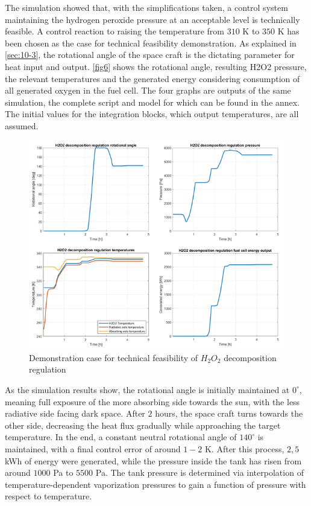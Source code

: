 The simulation showed that, with the simplifications taken, a control system maintaining the hydrogen peroxide pressure at an acceptable level is technically feasible. A control reaction to raising the temperature from $310$ K to $350$ K has been chosen as the case for technical feasibility demonstration. As explained in \autoref{sec:10-3}, the rotational angle of the space craft is the dictating parameter for heat input and output. \autoref{fig6} shows the rotational angle, resulting H2O2 pressure, the relevant temperatures and the generated energy considering consumption of all generated oxygen in the fuel cell. The four graphs are outputs of the same simulation, the complete script and model for which can be found in the annex. The initial values for the integration blocks, which output temperatures, are all assumed.

\begin{figure}[H]
	\centering\includegraphics[width=\linewidth]{feasibility}
	\caption{Demonstration case for technical feasibility of $H_2O_2$ decomposition regulation}\label{fig6}
\end{figure}
As the simulation results show, the rotational angle is initially maintained at $0^\circ$, meaning full exposure of the more absorbing side towards the sun, with the less radiative side facing dark space. After $2$ hours, the space craft turns towards the other side, decreasing the heat flux gradually while approaching the target temperature. In the end, a constant neutral rotational angle of $140^\circ$ is maintained, with a final control error of around $1-2$ K. After this process, $2,5$ kWh of energy were generated, while the pressure inside the tank has risen from around $1000$ Pa to $5500$ Pa. The tank pressure is determined via interpolation of temperature-dependent vaporization pressures to gain a function of pressure with respect to temperature.